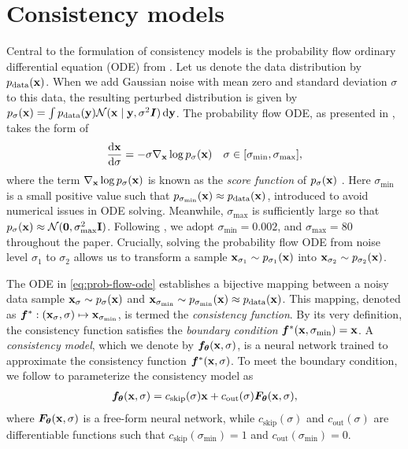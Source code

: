 \section{Consistency models}\label{sec:background}

Central to the formulation of consistency models is the probability flow ordinary differential equation (ODE) from \citet{song2021scorebased}. Let us denote the data distribution by $p_\text{data}({\mathbf{x}})$. When we add Gaussian noise with mean zero and standard deviation $\sigma$ to this data, the resulting perturbed distribution is given by $p_\sigma({\mathbf{x}}) = \int p_\text{data}({\mathbf{y}}) \mathcal{N}({\mathbf{x}} \mid {\mathbf{y}}, \sigma^2 {\bm{I}}) \mathop{}\!\mathrm{d} {\mathbf{y}}$. The probability flow ODE, as presented in \citet{Karras2022edm}, takes the form of
\begin{align}
    \frac{\mathop{}\!\mathrm{d} {\mathbf{x}}}{\mathop{}\!\mathrm{d} \sigma} = -\sigma \nabla_{\mathbf{x}} \log p_{\sigma}({\mathbf{x}})\quad \sigma \in[\sigma_\text{min}, \sigma_\text{max}],\label{eq:prob-flow-ode}
\end{align}
where the term $\nabla_{\mathbf{x}} \log p_{\sigma}({\mathbf{x}})$ is known as the \emph{score function} of $p_{\sigma}({\mathbf{x}})$ \citep{song2019sliced,song2019generative,song2020improved,song2021scorebased}. Here $\sigma_\text{min}$ is a small positive value such that $p_{\sigma_\text{min}}({\mathbf{x}}) \approx p_\text{data}({\mathbf{x}})$, introduced to avoid numerical issues in ODE solving. Meanwhile, $\sigma_\text{max}$ is sufficiently large so that $p_{\sigma}({\mathbf{x}}) \approx \mathcal{N}(\bm{0}, \sigma_\text{max}^2 \mathbf{I})$. Following \citet{Karras2022edm,song2023consistency}, we adopt $\sigma_\text{min} = 0.002$, and $\sigma_\text{max} = 80$ throughout the paper. Crucially, solving the probability flow ODE from noise level $\sigma_1$ to $\sigma_2$ allows us to transform a sample ${\mathbf{x}}_{\sigma_1} \sim p_{\sigma_1}({\mathbf{x}})$ into ${\mathbf{x}}_{\sigma_2} \sim p_{\sigma_2}({\mathbf{x}})$.


The ODE in \cref{eq:prob-flow-ode} establishes a bijective mapping between a noisy data sample ${\mathbf{x}}_\sigma \sim p_{\sigma}({\mathbf{x}})$ and ${\mathbf{x}}_{\sigma_\text{min}} \sim p_{\sigma_\text{min}}({\mathbf{x}}) \approx p_\text{data}({\mathbf{x}})$. This mapping, denoted as ${\bm{f}}^*: ({\mathbf{x}}_\sigma, \sigma) \mapsto {\mathbf{x}}_{\sigma_\text{min}}$, is termed the \emph{consistency function}. By its very definition, the consistency function satisfies the \emph{boundary condition} ${\bm{f}}^*({\mathbf{x}}, \sigma_\text{min}) = {\mathbf{x}}$. A \emph{consistency model}, which we denote by ${\bm{f}}_{\bm{\theta}}({\mathbf{x}}, \sigma)$, is a neural network trained to approximate the consistency function ${\bm{f}}^*({\mathbf{x}}, \sigma)$. To meet the boundary condition, we follow \citet{song2023consistency} to parameterize the consistency model as
\begin{align}
{\bm{f}}_{\bm{\theta}}({\mathbf{x}}, \sigma) = c_\text{skip}(\sigma) {\mathbf{x}} + c_\text{out}(\sigma) \bm{F}_{\bm{\theta}}({\mathbf{x}}, \sigma),
\end{align}
where $\bm{F}_{\bm{\theta}}({\mathbf{x}}, \sigma)$ is a free-form neural network, while $c_\text{skip}(\sigma)$ and $c_\text{out}(\sigma)$ are differentiable functions such that $c_\text{skip}(\sigma_\text{min}) = 1$ and $c_\text{out}(\sigma_\text{min}) = 0$.


